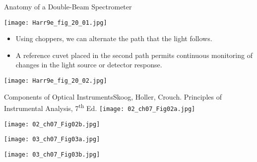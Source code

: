 \documentclass[handout]{beamer}
\begin{document}
\begin{frame}[allowframebreaks]{Anatomy of a Double-Beam Spectrometer}
	\begin{center}
		\texttt{[image: Harr9e\_fig\_20\_01.jpg]}
	\end{center}

	\begin{itemize}
		\item Using \alert{choppers}, we can alternate the path that the
			light follows.
		\item A reference cuvet placed in the second path permits
			continuous monitoring of changes in the light source or
			detector response.
	\end{itemize}

	\framebreak

	\begin{center}
		\texttt{[image: Harr9e\_fig\_20\_02.jpg]}
	\end{center}
\end{frame}

\begin{frame}[allowframebreaks]{Components of Optical Instruments}{Skoog,
	Holler, Crouch. Principles of Instrumental Analysis,
	7\textsuperscript{th} Ed.}
	\texttt{[image: 02\_ch07\_Fig02a.jpg]}

	\texttt{[image: 02\_ch07\_Fig02b.jpg]}

	\texttt{[image: 03\_ch07\_Fig03a.jpg]}

	\texttt{[image: 03\_ch07\_Fig03b.jpg]}
\end{frame}
\end{document}
